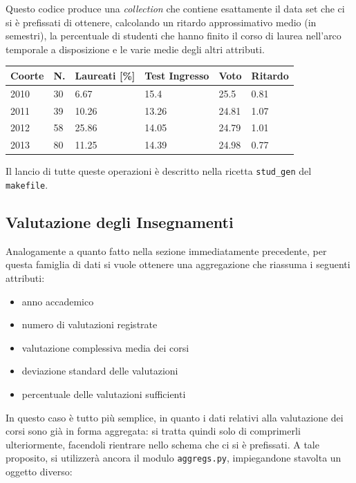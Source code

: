 		Questo codice produce una \textit{collection} che contiene esattamente il data set che ci si è prefissati di ottenere, calcolando un ritardo 	approssimativo medio (in semestri), la percentuale di studenti che hanno finito il corso di laurea nell'arco temporale a disposizione e le varie medie 	degli altri attributi.\\

		\begin{tabular}{llllll}
		\hline
		Coorte & N. & Laureati {[}\%{]} & Test Ingresso & Voto & Ritardo \\ \hline
		2010 & 30 & 6.67 & 15.4 & 25.5 & 0.81 \\
		2011 & 39 & 10.26 & 13.26 & 24.81 & 1.07 \\
		2012 & 58 & 25.86 & 14.05 & 24.79 & 1.01 \\
		2013 & 80 & 11.25 & 14.39 & 24.98 & 0.77 \\ \hline
		\end{tabular}

		\vspace{0.3cm}

		Il lancio di tutte queste operazioni è descritto nella ricetta \texttt{stud\_gen} del \texttt{makefile}.

	\subsection{Valutazione degli Insegnamenti}

		Analogamente a quanto fatto nella sezione immediatamente precedente, per questa famiglia di dati si vuole ottenere una aggregazione che riassuma i seguenti attributi:

		\begin{itemize}
			\item anno accademico
			\item numero di valutazioni registrate
			\item valutazione complessiva media dei corsi
			\item deviazione standard delle valutazioni
			\item percentuale delle valutazioni sufficienti
		\end{itemize}

		In questo caso è tutto più semplice, in quanto i dati relativi alla valutazione dei corsi sono già in forma aggregata: si tratta quindi solo di comprimerli ulteriormente, facendoli rientrare nello schema che ci si è prefissati. A tale proposito, si utilizzerà ancora il modulo \texttt{aggregs.py}, impiegandone stavolta un oggetto diverso:

